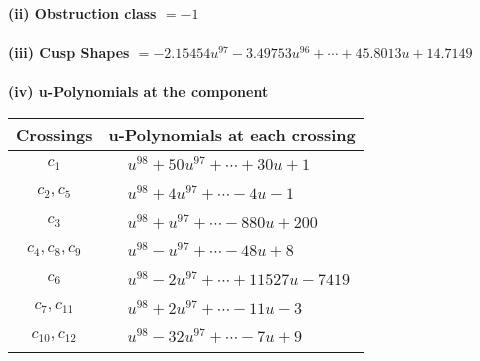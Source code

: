 \documentclass[1p]{elsarticle_modified}
\theoremstyle{definition}
\begin{document}
\flushleft \textbf{(ii) Obstruction class $= -1$}\\~\\
\flushleft \textbf{(iii) Cusp Shapes $= -2.15454 u^{97}-3.49753 u^{96}+\cdots+45.8013 u+14.7149$}\\~\\
\newpage\renewcommand{\arraystretch}{1}
\flushleft \textbf{(iv) u-Polynomials at the component}\newline \\
\begin{tabular}{m{50pt}|m{274pt}}
Crossings & \hspace{64pt}u-Polynomials at each crossing \\
\hline $$\begin{aligned}c_{1}\end{aligned}$$&$\begin{aligned}
&u^{98}+50 u^{97}+\cdots+30 u+1
\end{aligned}$\\
\hline $$\begin{aligned}c_{2},c_{5}\end{aligned}$$&$\begin{aligned}
&u^{98}+4 u^{97}+\cdots-4 u-1
\end{aligned}$\\
\hline $$\begin{aligned}c_{3}\end{aligned}$$&$\begin{aligned}
&u^{98}+u^{97}+\cdots-880 u+200
\end{aligned}$\\
\hline $$\begin{aligned}c_{4},c_{8},c_{9}\end{aligned}$$&$\begin{aligned}
&u^{98}- u^{97}+\cdots-48 u+8
\end{aligned}$\\
\hline $$\begin{aligned}c_{6}\end{aligned}$$&$\begin{aligned}
&u^{98}-2 u^{97}+\cdots+11527 u-7419
\end{aligned}$\\
\hline $$\begin{aligned}c_{7},c_{11}\end{aligned}$$&$\begin{aligned}
&u^{98}+2 u^{97}+\cdots-11 u-3
\end{aligned}$\\
\hline $$\begin{aligned}c_{10},c_{12}\end{aligned}$$&$\begin{aligned}
&u^{98}-32 u^{97}+\cdots-7 u+9
\end{aligned}$\\
\hline
\end{tabular}\\~\\
\end{document}
